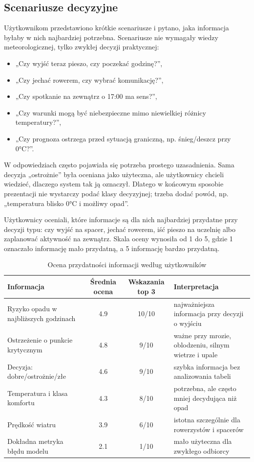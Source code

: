 \documentclass[a4paper,12pt]{article}
\begin{document}
\subsection{Scenariusze decyzyjne}

Użytkownikom przedstawiono krótkie scenariusze i pytano, jaka informacja byłaby
w nich najbardziej potrzebna. Scenariusze nie wymagały wiedzy meteorologicznej,
tylko zwykłej decyzji praktycznej:
\begin{itemize}
    \item „Czy wyjść teraz pieszo, czy poczekać godzinę?”,
    \item „Czy jechać rowerem, czy wybrać komunikację?”,
    \item „Czy spotkanie na zewnątrz o 17:00 ma sens?”,
    \item „Czy warunki mogą być niebezpieczne mimo niewielkiej różnicy temperatury?”,
    \item „Czy prognoza ostrzega przed sytuacją graniczną, np. śnieg/deszcz przy 0°C?”.
\end{itemize}

W odpowiedziach często pojawiała się potrzeba prostego uzasadnienia. Sama
decyzja „ostrożnie” była oceniana jako użyteczna, ale użytkownicy chcieli
wiedzieć, dlaczego system tak ją oznaczył. Dlatego w końcowym sposobie
prezentacji nie wystarczy podać klasy decyzyjnej; trzeba dodać powód, np.
„temperatura blisko 0°C i możliwy opad”.

Użytkownicy oceniali, które informacje są dla nich najbardziej przydatne przy
decyzji typu: czy wyjść na spacer, jechać rowerem, iść pieszo na uczelnię albo
zaplanować aktywność na zewnątrz. Skala oceny wynosiła od 1 do 5, gdzie 1
oznaczało informację mało przydatną, a 5 informację bardzo przydatną.

\begin{table}[h]
\centering
\caption{Ocena przydatności informacji według użytkowników}
\small
\begin{tabularx}{\textwidth}{p{4.4cm}ccX}
\toprule
Informacja & Średnia ocena & Wskazania top 3 & Interpretacja \\
\midrule
Ryzyko opadu w najbliższych godzinach & 4.9 & 10/10 & najważniejsza informacja przy decyzji o wyjściu \\
Ostrzeżenie o punkcie krytycznym & 4.8 & 9/10 & ważne przy mrozie, oblodzeniu, silnym wietrze i upale \\
Decyzja: dobre/ostrożnie/złe & 4.6 & 9/10 & szybka informacja bez analizowania tabeli \\
Temperatura i klasa komfortu & 4.3 & 8/10 & potrzebna, ale często mniej decydująca niż opad \\
Prędkość wiatru & 3.9 & 6/10 & istotna szczególnie dla rowerzystów i spacerów \\
Dokładna metryka błędu modelu & 2.1 & 1/10 & mało użyteczna dla zwykłego odbiorcy \\
\bottomrule
\end{tabularx}
\normalsize
\end{table}
\end{document}
